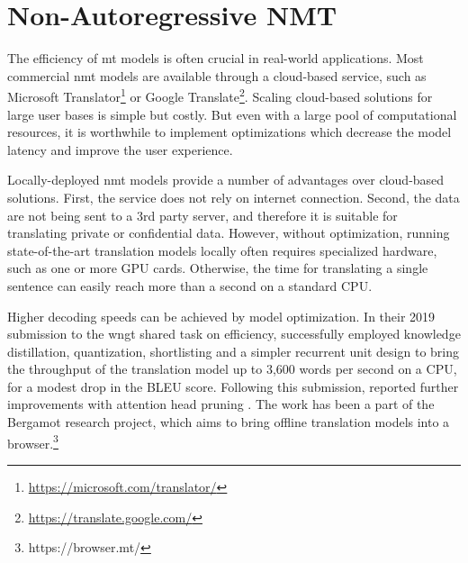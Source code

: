 \chapter{Non-Autoregressive NMT}
\label{chap:nat}


The efficiency of \ac{mt} models is often crucial in real-world applications.
Most commercial \ac{nmt} models are available through a cloud-based service,
such as Microsoft Translator\footnote{\url{https://microsoft.com/translator/}}
or Google Translate\footnote{\url{https://translate.google.com/}}. Scaling
cloud-based solutions for large user bases is simple but costly. But even with
a large pool of computational resources, it is worthwhile to implement
optimizations which decrease the model latency and improve the user experience.


Locally-deployed \ac{nmt} models provide a number of advantages over
cloud-based solutions. First, the service does not rely on internet
connection. Second, the data are not being sent to a 3rd party server, and
therefore it is suitable for translating private or confidential data.
However, without optimization, running state-of-the-art translation models
locally often requires specialized hardware, such as one or more GPU
cards. Otherwise, the time for translating a single sentence can easily reach
more than a second on a standard CPU.

Higher decoding speeds can be achieved by model optimization. In their 2019
submission to the \ac{wngt} shared task on efficiency,
\citet{kim-etal-2019-research} successfully employed knowledge distillation,
quantization, shortlisting \citep{jean-etal-2015-using} and a simpler recurrent
unit design to bring the throughput of the translation model up to 3,600 words
per second on a CPU, for a modest drop in the BLEU score. Following this
submission, \citet{bogoychev-etal-2020-edinburghs} reported further
improvements with attention head pruning \citep{voita-etal-2019-analyzing}. The
work has been a part of the Bergamot research project, which aims to bring
offline translation models into a browser.\footnote{https://browser.mt/}

